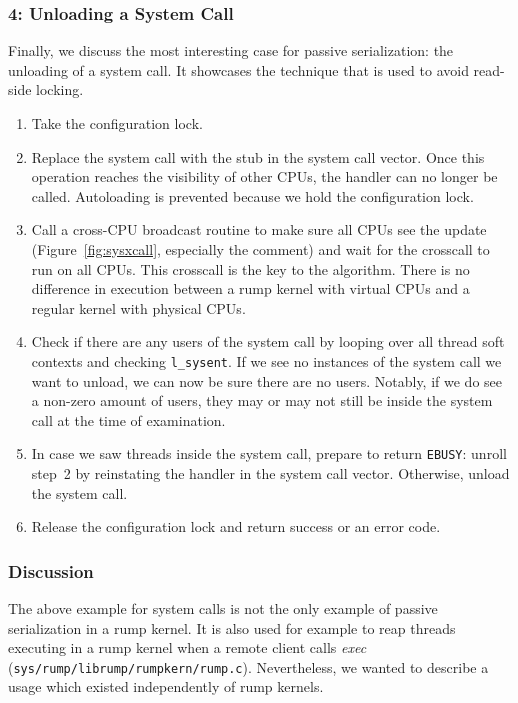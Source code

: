 \subsubsection*{4: Unloading a System Call}

Finally, we discuss the most interesting case for passive serialization:
the unloading of a system call.  It showcases the technique that
is used to avoid read-side locking.

\begin{enumerate}
\item	Take the configuration lock.
\item	Replace the system call with the stub in the system call vector.
	Once this operation reaches the visibility of other CPUs, the
	handler can no longer be called.  Autoloading is prevented because
	we hold the configuration lock.
\item   Call a cross-CPU broadcast routine to make sure all CPUs
	see the update (Figure~\ref{fig:sysxcall}, especially the
	comment) and wait for the crosscall to run on all CPUs.
	This crosscall is the key to the algorithm.  There is no difference
	in execution between a rump kernel with virtual CPUs and
	a regular kernel with physical CPUs.
\item   Check if there are any users of the system call by
	looping over all thread soft contexts and checking
	\verb+l_sysent+.  If we see no instances of the system call
	we want to unload, we can now be sure there are no users.
	Notably, if we do see a non-zero amount of users, they may
	or may not still be inside the system call at the time of
	examination.
\item   In case we saw threads inside the system call, prepare to
	return \texttt{EBUSY}: unroll step~2 by reinstating the
	handler in the system call vector.  Otherwise, unload the
	system call.
\item   Release the configuration lock and return success or an
	error code.
\end{enumerate}

\subsubsection*{Discussion}

The above example for system calls is not the only example of passive
serialization in a rump kernel.  It is also used for example to
reap threads executing in a rump kernel when a remote client calls
\textit{exec} (\texttt{sys/rump/librump/rumpkern/rump.c}).  Nevertheless,
we wanted to describe a usage which existed independently of rump
kernels.

